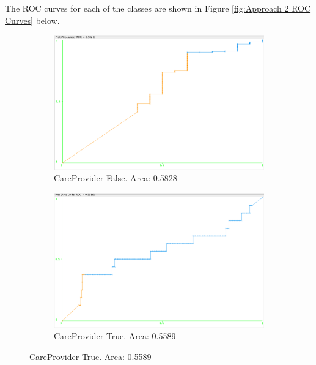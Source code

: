 \documentclass[11pt, notitlepage,abstracton,oneside]{article}   	%
\begin{document}
The ROC curves for each of the classes are shown in Figure \ref{fig:Approach 2 ROC Curves} below.

\begin{figure}[H]
    \centering
    \begin{subfigure}[b]{0.45\textwidth}
        \centering
        \includegraphics[width=\textwidth]{figures/approach2/CareProvider-False(0)}
        \caption{CareProvider-False. Area: 0.5828}
        \label{fig:CareProvider-False(0)}
    \end{subfigure}
    \hfill
    \begin{subfigure}[b]{0.45\textwidth}
        \centering
        \includegraphics[width=\textwidth]{figures/approach2/CareProvider-True(1)}
        \caption{CareProvider-True. Area: 0.5589}
        \label{fig:CareProvider-True(1)}
    \end{subfigure}
    \hfill


\end{figure}
\end{document}
